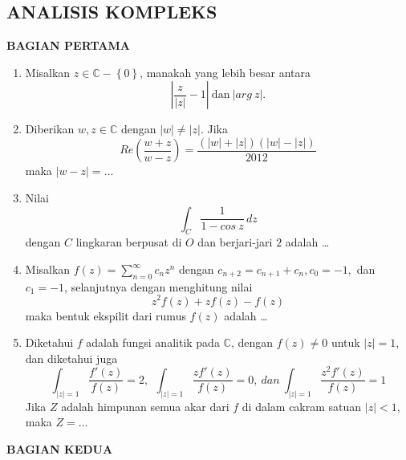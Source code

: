 \documentclass[12pt,twoside]{article}
\begin{document}
\subsection{ANALISIS KOMPLEKS}
\textbf{BAGIAN PERTAMA}
\begin{enumerate}
	\item Misalkan $z \in \mathbb{C}-\left\lbrace 0 \right\rbrace$, manakah yang lebih besar antara
	      \begin{equation*}
		      \displaystyle \left| \dfrac{z}{|z|} - 1 \right| ~ \text{dan} ~ \displaystyle |arg~z|.
	      \end{equation*}

	\item Diberikan $w,z \in \mathbb{C}$ dengan $|w| \neq |z|$. Jika
	      \begin{equation*}
		      Re \left( \dfrac{w+z}{w-z} \right) = \dfrac{(|w|+|z|)(|w|-|z|)}{2012}
	      \end{equation*}
	      maka $|w-z|=\dots$

	\item Nilai
	      \begin{equation*}
		      \displaystyle\int_{C}^{} \dfrac{1}{1- cos~z}\,dz
	      \end{equation*}
	      dengan $C$ lingkaran berpusat di $O$ dan berjari-jari $2$ adalah \dots

	\item Misalkan $f(z) = \sum_{n=0}^{\infty} c_nz^n$ dengan $c_{n+2}=c_{n+1}+c_n, c_0 = -1, $ dan $c_1 = -1$, selanjutnya dengan menghitung nilai
	      \begin{equation*}
		      z^2f(z)+zf(z)-f(z)
	      \end{equation*}
	      maka bentuk ekspilit dari rumus $f(z)$ adalah \dots

	\item Diketahui $f$ adalah fungsi analitik pada $\mathbb{C}$, dengan $f(z)\neq 0$ untuk $|z|=1$, dan diketahui juga
	      \begin{equation*}
		      \displaystyle\int_{|z|=1}^{} \dfrac{f'(z)}{f(z)} = 2, ~~
		      \displaystyle\int_{|z|=1}^{} \dfrac{zf'(z)}{f(z)} = 0, ~ dan ~
		      \displaystyle\int_{|z|=1}^{} \dfrac{z^2f'(z)}{f(z)} = 1
	      \end{equation*}
	      Jika $Z$ adalah himpunan semua akar dari $f$ di dalam cakram satuan $|z| < 1$, maka $Z = \dots$

\end{enumerate}
\newpage \textbf{BAGIAN KEDUA}
\end{document}
